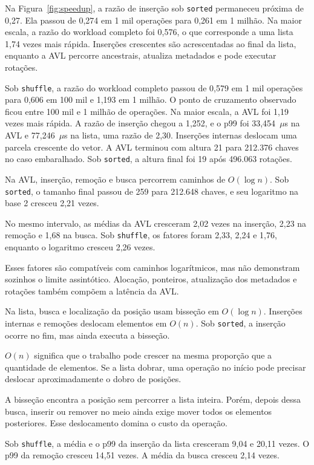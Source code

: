 \documentclass[12pt]{article}
\begin{document}
{Na Figura~\ref{fig:speedup}, a razão de inserção sob \texttt{sorted} permaneceu próxima de 0,27. Ela passou de 0,274 em 1 mil operações para 0,261 em 1 milhão. Na maior escala, a razão do workload completo foi 0,576, o que corresponde a uma lista 1,74 vezes mais rápida. Inserções crescentes são acrescentadas ao final da lista, enquanto a AVL percorre ancestrais, atualiza metadados e pode executar rotações.}

{Sob \texttt{shuffle}, a razão do workload completo passou de 0,579 em 1 mil operações para 0,606 em 100 mil e 1,193 em 1 milhão. O ponto de cruzamento observado ficou entre 100 mil e 1 milhão de operações. Na maior escala, a AVL foi 1,19 vezes mais rápida. A razão de inserção chegou a 1,252, e o p99 foi 33,454~$\mu$s na AVL e 77,246~$\mu$s na lista, uma razão de 2,30. Inserções internas deslocam uma parcela crescente do vetor. A AVL terminou com altura 21 para 212.376 chaves no caso embaralhado. Sob \texttt{sorted}, a altura final foi 19 após 496.063 rotações.}

{Na AVL, inserção, remoção e busca percorrem caminhos de $O(\log n)$. Sob \texttt{sorted}, o tamanho final passou de 259 para 212.648 chaves, e seu logaritmo na base 2 cresceu 2,21 vezes.}

{No mesmo intervalo, as médias da AVL cresceram 2,02 vezes na inserção, 2,23 na remoção e 1,68 na busca. Sob \texttt{shuffle}, os fatores foram 2,33, 2,24 e 1,76, enquanto o logaritmo cresceu 2,26 vezes.}

{Esses fatores são compatíveis com caminhos logarítmicos, mas não demonstram sozinhos o limite assintótico. Alocação, ponteiros, atualização dos metadados e rotações também compõem a latência da AVL.}

{Na lista, busca e localização da posição usam bisseção em $O(\log n)$. Inserções internas e remoções deslocam elementos em $O(n)$. Sob \texttt{sorted}, a inserção ocorre no fim, mas ainda executa a bisseção.}

{$O(n)$ significa que o trabalho pode crescer na mesma proporção que a quantidade de elementos. Se a lista dobrar, uma operação no início pode precisar deslocar aproximadamente o dobro de posições.}

{A bisseção encontra a posição sem percorrer a lista inteira. Porém, depois dessa busca, inserir ou remover no meio ainda exige mover todos os elementos posteriores. Esse deslocamento domina o custo da operação.}

{Sob \texttt{shuffle}, a média e o p99 da inserção da lista cresceram 9,04 e 20,11 vezes. O p99 da remoção cresceu 14,51 vezes. A média da busca cresceu 2,14 vezes.}
\end{document}
